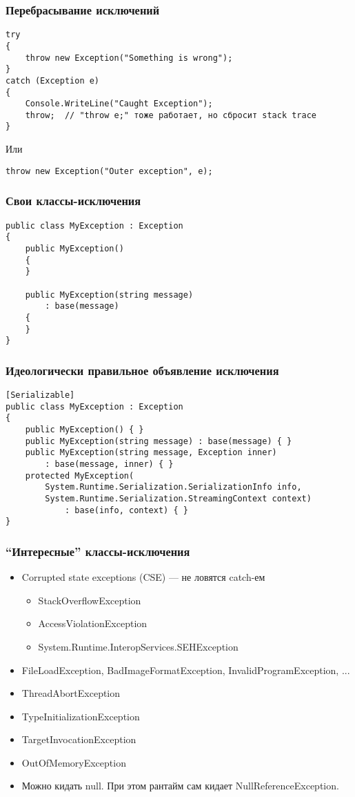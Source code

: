 \documentclass[xetex,mathserif,serif]{beamer}
\begin{document}
	\begin{frame}[fragile]
		\frametitle{Перебрасывание исключений}
		\begin{verbatim}
try
{
    throw new Exception("Something is wrong");
}
catch (Exception e)
{
    Console.WriteLine("Caught Exception");
    throw;  // "throw e;" тоже работает, но сбросит stack trace
}
		\end{verbatim}

		Или
		\begin{verbatim}
throw new Exception("Outer exception", e);
		\end{verbatim}
	\end{frame}

	\begin{frame}[fragile]
		\frametitle{Свои классы-исключения}
		\begin{verbatim}
public class MyException : Exception
{
    public MyException() 
    {
    }

    public MyException(string message)
        : base(message)
    {
    }
}
		\end{verbatim}
	\end{frame}

	\begin{frame}[fragile]
		\frametitle{Идеологически правильное объявление исключения}
		\begin{verbatim}
[Serializable]
public class MyException : Exception
{
    public MyException() { }
    public MyException(string message) : base(message) { }
    public MyException(string message, Exception inner) 
        : base(message, inner) { }
    protected MyException(
        System.Runtime.Serialization.SerializationInfo info,
        System.Runtime.Serialization.StreamingContext context)
            : base(info, context) { }
}
		\end{verbatim}
	\end{frame}

	\begin{frame}
		\frametitle{``Интересные'' классы-исключения}
		\begin{itemize}
			\item Corrupted state exceptions (CSE) --- не ловятся catch-ем
			\begin{itemize}
				\item StackOverflowException
				\item AccessViolationException
				\item System.Runtime.InteropServices.SEHException
			\end{itemize}
			\item FileLoadException, BadImageFormatException, InvalidProgramException, ...
			\item ThreadAbortException
			\item TypeInitializationException
			\item TargetInvocationException
			\item OutOfMemoryException
			\item Можно кидать null. При этом рантайм сам кидает NullReferenceException.
		\end{itemize}
	\end{frame}
\end{document}
